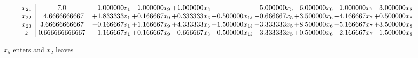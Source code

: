 \documentclass[10pt]{article}
\begin{document}
\[\begin{array}{c| c c@{\hskip 2pt} c@{\hskip 2pt} c@{\hskip 2pt} c@{\hskip 2pt} c@{\hskip 2pt} c@{\hskip 2pt} c@{\hskip 2pt} c@{\hskip 2pt} }
 x_{21}   &  7.0 & -1.000000 x_{1} & -1.000000 x_{9} & + 1.000000 x_{3} &   & -5.000000 x_{5} & -6.000000 x_{6} & -1.000000 x_{7} & -3.000000 x_{8}\\
 x_{22}   &  14.6666666667 & + 1.833333 x_{1} & + 0.166667 x_{9} & + 0.333333 x_{3} & -0.500000 x_{15} & -0.666667 x_{5} & + 3.500000 x_{6} & -4.166667 x_{7} & + 0.500000 x_{8}\\
 x_{23}   &  3.66666666667 & -0.166667 x_{1} & + 1.166667 x_{9} & + 4.333333 x_{3} & -1.500000 x_{15} & + 3.333333 x_{5} & + 8.500000 x_{6} & -5.166667 x_{7} & + 3.500000 x_{8}\\
\hline
z    &  0.666666666667 & -1.166667 x_{1} & + 0.166667 x_{9} & -0.666667 x_{3} & -0.500000 x_{15} & + 3.333333 x_{5} & + 0.500000 x_{6} & -2.166667 x_{7} & -1.500000 x_{8}\\
\end{array}\]


 $ x_{5} $ enters and $ x_{2} $ leaves 
\end{document}
